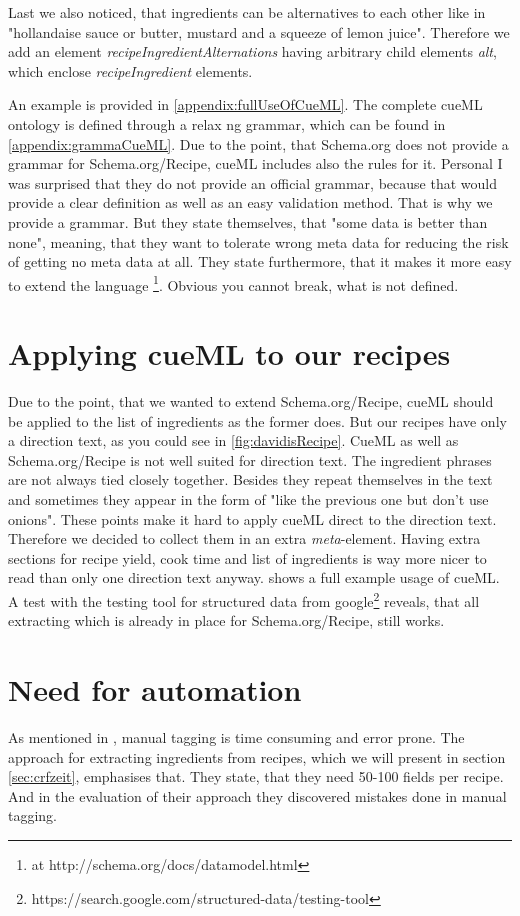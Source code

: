 \documentclass[12pt, twoside]{report}
\begin{document}
Last we also noticed, that ingredients can be alternatives to each other like in "hollandaise sauce or butter, mustard and a squeeze of lemon juice". Therefore we add an element \textit{recipeIngredientAlternations} having arbitrary child elements \textit{alt}, which enclose \textit{recipeIngredient} elements.

An example is provided in \cref{appendix:fullUseOfCueML}. The complete cueML ontology is defined through a relax ng grammar, which can be found in \cref{appendix:grammaCueML}. Due to the point, that Schema.org does not provide a grammar for Schema.org/Recipe, cueML includes also the rules for it. Personal I was surprised that they do not provide an official grammar, because that would provide a clear definition as well as an easy validation method. That is why we provide a grammar. But they state themselves, that "some data is better than none", meaning, that they want to tolerate wrong meta data for reducing the risk of getting no meta data at all. They state furthermore, that it makes it more easy to extend the language \parencite{schemaOrg}\footnote{at http://schema.org/docs/datamodel.html}. Obvious you cannot break, what is not defined. 


\section{Applying cueML to our recipes}
Due to the point, that we wanted to extend Schema.org/Recipe, cueML should be applied to the list of ingredients as the former does. But our recipes have only a direction text, as you could see in \cref{fig:davidisRecipe}. CueML as well as Schema.org/Recipe is not well suited for direction text. The ingredient phrases are not always tied closely together. Besides they repeat themselves in the text and sometimes they appear in the form of "like the previous one but don't use onions". These points make it hard to apply cueML direct to the direction text. Therefore we decided to collect them in an extra \textit{meta}-element. Having extra sections for recipe yield, cook time and list of ingredients is way more nicer to read than only one direction text anyway.  shows a full example usage of cueML. A test with the testing tool for structured data from google\footnote{https://search.google.com/structured-data/testing-tool} reveals, that all extracting which is already in place for Schema.org/Recipe, still works. 


\section{Need for automation}
As mentioned in \parencite{manualTagging}, manual tagging is time consuming and error prone. The approach for extracting ingredients from recipes, which we will present in section \ref{sec:crfzeit}, emphasises that. They state, that they need 50-100 fields per recipe. And in the evaluation of their approach they discovered mistakes done in manual tagging.
\end{document}
